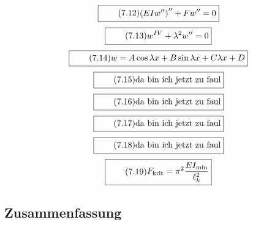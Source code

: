 \documentclass[11pt]{article}
\newcommand{\1}{ {\mathds{1}} }
\begin{document}
\begin{multicols}{2}
		\begin{equation}
			\boxed{
				\tag{7.12}
				\begin{split}
					\left(EIw''\right)'' + Fw'' = 0
				\end{split}
			}
		\end{equation}
		\begin{equation}
			\boxed{
				\tag{7.13}
				\begin{split}
					w^{IV} + \lambda^2w'' = 0
				\end{split}
			}
		\end{equation}
		\begin{equation}
			\boxed{
				\tag{7.14}
				\begin{split}
					w = A\cos \lambda x + B \sin \lambda x + C \lambda x + D
				\end{split}
			}
		\end{equation}
		\begin{equation}
			\boxed{
				\tag{7.15}
				\begin{split}
					\text{da bin ich jetzt zu faul}
				\end{split}
			}
		\end{equation}
		\begin{equation}
			\boxed{
				\tag{7.16}
				\begin{split}
					\text{da bin ich jetzt zu faul}
				\end{split}
			}
		\end{equation}
		\begin{equation}
			\boxed{
				\tag{7.17}
				\begin{split}
					\text{da bin ich jetzt zu faul}
				\end{split}
			}
		\end{equation}
		\begin{equation}
			\boxed{
				\tag{7.18}
				\begin{split}
					\text{da bin ich jetzt zu faul}
				\end{split}
			}
		\end{equation}
		\begin{equation}
			\boxed{
				\tag{7.19}
				\begin{split}
					F_{\text{krit}} = \pi^2\frac{EI_{\text{min}}}{\ell^2_k}
				\end{split}
			}
		\end{equation}

		\subsection{Zusammenfassung}
	

\end{multicols}
\end{document}
